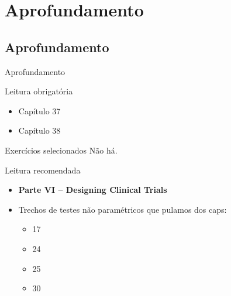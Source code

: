 \documentclass{beamer}
\begin{document}
\section{Aprofundamento}

\subsection{Aprofundamento}

\begin{frame}{Aprofundamento}
  \begin{block}{Leitura obrigatória}
    \begin{itemize}
      \small
    \item Capítulo 37
    \item Capítulo 38
    \end{itemize}
  \end{block}
  \begin{block}{Exercícios selecionados}
    \small
    Não há.
  \end{block}
  \begin{block}{Leitura recomendada}
    \begin{itemize}
    \item {\bf Parte VI -- Designing Clinical Trials}
    \scriptsize
    \item Trechos de testes não paramétricos que pulamos dos caps:
      \begin{itemize}
        \scriptsize
      \item 17
      \item 24
      \item 25
      \item 30
      \end{itemize}
    \end{itemize}
  \end{block}
\end{frame}
\end{document}
